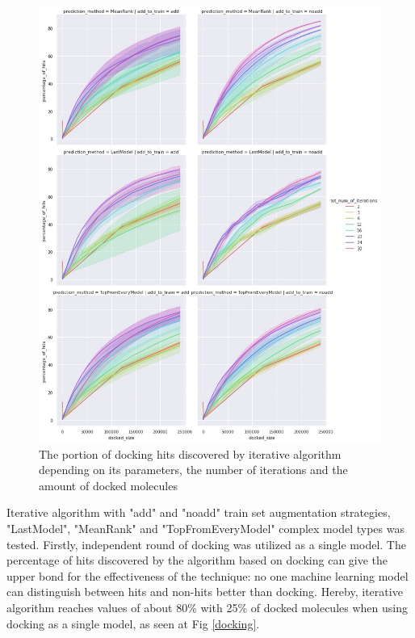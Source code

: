 \begin{figure}
    \centering
    \includegraphics[width = \linewidth]{Images/LinregIterations.jpg}
    \caption{The portion of docking hits discovered by iterative algorithm depending on its parameters, the number of iterations and the amount of docked molecules}
\end{figure}

Iterative algorithm with "add" and "noadd" train set augmentation strategies, "LastModel", "MeanRank" and "TopFromEveryModel" complex model types was tested. 
Firstly, independent round of docking was utilized as a single model.
The percentage of hits discovered by the algorithm based on docking can give the upper bond for the effectiveness of the technique: no one machine learning model can distinguish between hits and non-hits better than docking. 
Hereby, iterative algorithm reaches values of about 80\% with 25\% of docked molecules when using docking as a single model, as seen at Fig \ref{docking}.\\

